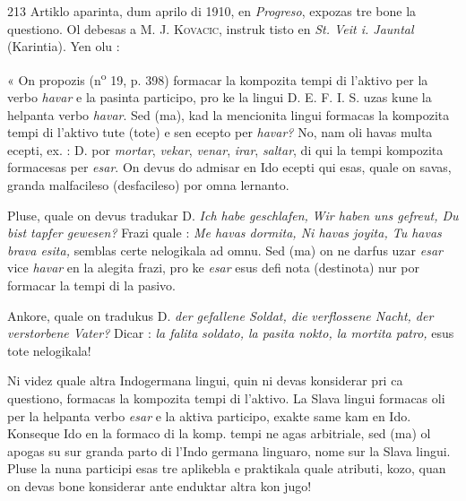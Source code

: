 \begin{VUpage}[217]{213}
Artiklo aparinta, dum aprilo di 1910, en \textit{Progreso}, expozas\nl
tre bone la questiono. Ol debesas a M. J. \textsc{Kovacic}, instruk\cc
tisto en \textit{St. Veit i. Jauntal} (Karintia). Yen olu :

« On propozis (n\textsuperscript{o} 19, p. 398) formacar la kompozita\nl
tempi di l'aktivo per la verbo \textit{havar} e la pasinta participo,\nl
pro ke la lingui D. E. F. I. S. uzas kune la helpanta verbo\nl
\textit{havar}. Sed (ma), kad la mencionita lingui formacas la\nl
kompozita tempi di l'aktivo tute (tote) e sen ecepto per \textit{havar?}\nl
No, nam oli havas multa ecepti, ex. : D. por \textit{mortar}, \textit{vekar},\nl
\textit{venar}, \textit{irar}, \textit{saltar}, di qui la tempi kompozita formacesas per\nl
\textit{esar}. On devus do admisar en Ido ecepti qui esas, quale on\nl
savas, granda malfacileso (desfacileso) por omna lernanto.\parplein

Pluse, quale on devus tradukar D. \textit{Ich habe geschlafen,}\nl
\textit{Wir haben uns gefreut, Du bist tapfer gewesen?} Frazi quale :\nl
\textit{Me havas dormita, Ni havas joyita, Tu havas brava esita,}\nl
semblas certe nelogikala ad omnu. Sed (ma) on ne darfus\nl
uzar \textit{esar} vice \textit{havar} en la alegita frazi, pro ke \textit{esar} esus defi\cc
nota (destinota) nur por formacar la tempi di la pasivo.

Ankore, quale on tradukus D. \textit{der gefallene Soldat, die}\nl
\textit{verflossene Nacht, der verstorbene Vater?} Dicar : \textit{la falita}\nl
\textit{soldato, la pasita nokto, la mortita patro,} esus tote nelogikala!\parplein

Ni videz quale altra Indogermana lingui, quin ni devas\nl
konsiderar pri ca questiono, formacas la kompozita tempi\nl
di l'aktivo. La Slava lingui formacas oli per la helpanta\nl
verbo \textit{esar} e la aktiva participo, exakte same kam en Ido.\nl
Konseque Ido en la formaco di la komp. tempi ne agas\nl
arbitriale, sed (ma) ol apogas su sur granda parto di l'Indo\cc
germana linguaro, nome sur la Slava lingui. Pluse la nuna\nl
participi esas tre aplikebla e praktikala quale atributi, kozo,\nl
quan on devas bone konsiderar ante enduktar altra kon\cc
jugo!


\end{VUpage}
